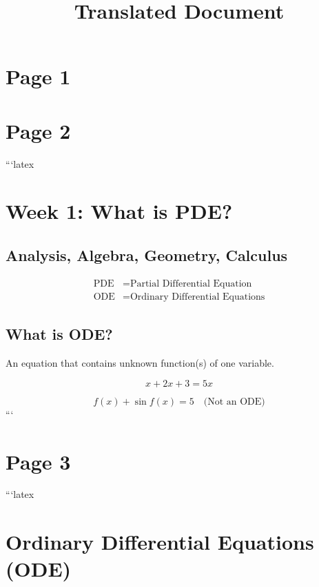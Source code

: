 \documentclass[11pt]{article}
\title{Translated Document}
\date{}
\begin{document}
\maketitle
\clearpage
\section*{Page 1}


\clearpage
\section*{Page 2}

```latex
\section*{Week 1: What is PDE?}

\subsection*{Analysis, Algebra, Geometry, Calculus}

\begin{align*}
    \text{PDE} &= \text{Partial Differential Equation} \\
    \text{ODE} &= \text{Ordinary Differential Equations}
\end{align*}

\subsection*{What is ODE?}

An equation that contains unknown function(s) of one variable.

\begin{equation}
    x + 2x + 3 = 5x
\end{equation}

\begin{equation}
    f(x) + \sin f(x) = 5 \quad \text{(Not an ODE)}
\end{equation}
```
\clearpage
\section*{Page 3}

```latex
\section*{Ordinary Differential Equations (ODE)}
\end{document}
